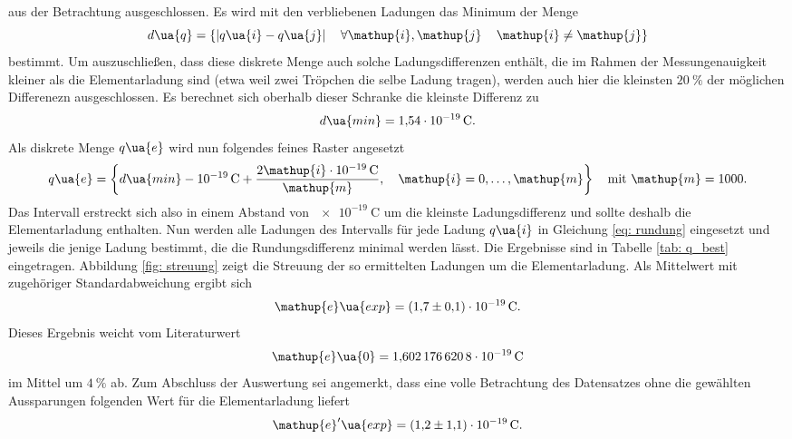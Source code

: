 aus der Betrachtung ausgeschlossen. Es wird mit den verbliebenen Ladungen das Minimum der Menge
\begin{equation}
  d\ua{q} = \left\{ \left| q\ua{i} - q\ua{j}\right| \quad \forall  \mathup{i}, \mathup{j} \, \quad \mathup{i} \neq \mathup{j}   \right\}
\end{equation}
bestimmt. Um auszuschließen, dass diese diskrete Menge auch solche Ladungsdifferenzen enthält, die im Rahmen der Messungenauigkeit
kleiner als die Elementarladung sind (etwa weil zwei Tröpchen die selbe Ladung tragen), werden auch hier die kleinsten $\SI{20}{\percent}$ der möglichen Differenezn ausgeschlossen.
Es berechnet sich oberhalb dieser Schranke die kleinste Differenz zu
\begin{equation}
  d\ua{min} = \SI{1.54e-19}{\coulomb}.
\end{equation}
Als diskrete Menge $q\ua{e}$ wird nun folgendes feines Raster angesetzt
\begin{equation}
  q\ua{e} = \left\{ d\ua{min} - \SI{e-19}{\coulomb}  +  \frac{2\mathup{i} \cdot \SI{e-19}{\coulomb}}{\mathup{m}}, \quad \mathup{i} = 0, \dots, \mathup{m}     \right\}\quad \text{mit} \, \,\mathup{m} = 1000.
\end{equation}
Das Intervall erstreckt sich also in einem Abstand von $\SI{e-19}{\coulomb}$ um die kleinste Ladungsdifferenz und sollte deshalb die Elementarladung enthalten.
Nun werden alle Ladungen des Intervalls für jede Ladung $q\ua{i}$ in Gleichung \eqref{eq: rundung} eingesetzt und jeweils die jenige Ladung bestimmt,
die die Rundungsdifferenz minimal werden lässt. Die Ergebnisse sind in Tabelle \ref{tab: q_best} eingetragen. Abbildung \ref{fig: streuung} zeigt die Streuung
der so ermittelten Ladungen um die Elementarladung. Als Mittelwert mit zugehöriger Standardabweichung ergibt sich
\begin{equation}
  \mathup{e}\ua{exp} = \SI{+1.7(1)e-19}{\coulomb}.
\end{equation}
Dieses Ergebnis weicht vom Literaturwert
\begin{equation}
  \mathup{e}\ua{0} = \SI{1.6021766208e-19}{\coulomb}
\end{equation}
im Mittel um $\SI{4}{\percent}$ ab. Zum Abschluss der Auswertung sei angemerkt, dass eine volle Betrachtung des Datensatzes ohne
die gewählten Aussparungen folgenden Wert für die Elementarladung liefert
\begin{equation}
   \mathup{e}'\ua{exp} = \SI{+1.2(11)e-19}{\coulomb}.
\end{equation}

